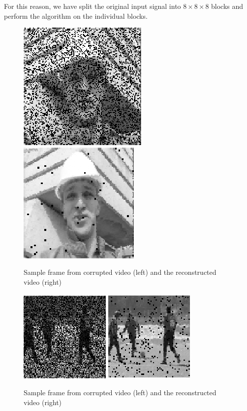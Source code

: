 For this reason, we have split the original input signal into $8\times 8\times 8$ blocks and perform the algorithm on the individual blocks.
\begin{figure}
\label{fig:foreman}
\includegraphics{Images/corr.png}
\includegraphics{Images/rec.png}
\caption{Sample frame from corrupted video (left) and the reconstructed video (right)}
\end{figure}

\begin{figure}
\label{fig:soccer}
\center
\includegraphics{Images/corr2.png}
\includegraphics{Images/rec2.png}
\caption{Sample frame from corrupted video (left) and the reconstructed video (right)}
\end{figure}

